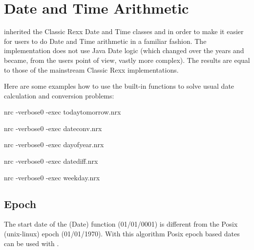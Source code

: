 \chapter{Date and Time Arithmetic}\label{refdatetimearith}
\nr{} inherited  the Classic Rexx Date and Time classes  and  in order to make it easier for \Rexx{} users to do Date and Time arithmetic in a familiar fashion. The implementation does not use Java Date logic (which changed over the years and became, from the \Rexx{} users point of view, vastly more complex). The results are equal to those of the mainstream Classic Rexx implementations.

Here are some examples how to use the \nr{} built-in functions to solve usual date calculation and conversion problems:



\begin{shaded}
\bash[stdout]
nrc -verbose0 -exec todaytomorrow.nrx
\END
\end{shaded}



\begin{shaded}
\bash[stdout]
nrc -verbose0 -exec dateconv.nrx
\END
\end{shaded}



\begin{shaded}
\bash[stdout]
nrc -verbose0 -exec dayofyear.nrx
\END
\end{shaded}



\begin{shaded}
\bash[stdout]
nrc -verbose0 -exec datediff.nrx
\END
\end{shaded}



\begin{shaded}
\bash[stdout]
nrc -verbose0 -exec weekday.nrx
\END
\end{shaded}

\section{Epoch}
The start date of the \Rexx{} \keyword(Date) function (01/01/0001) is different from the Posix (unix-linux) epoch (01/01/1970). With this algorithm Posix epoch based dates can be used with \nr{}.

